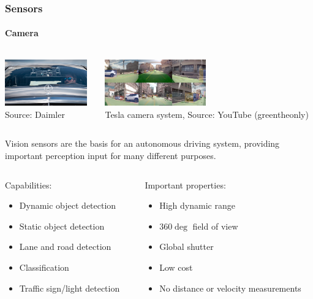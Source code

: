 \begin{frame}
\frametitle{Sensors}
\framesubtitle{Camera}
\begin{columns}[T]
    \begin{column}{.5\textwidth}
        \centering
        \includegraphics[height=2.0cm]{images/daimler_cameras.jpg}\\
        \tiny{Source: Daimler\footnotemark[1]}
    \end{column}
    \begin{column}{.5\textwidth}
        \centering
        \href{https://www.youtube.com/watch?v=rACZACXgreQ}{
        \includegraphics[height=2.0cm]{images/tesla_autopilot_cameras.jpg}}\\
        \tiny{Tesla camera system, Source: YouTube (greentheonly)\footnotemark[2]}
    \end{column}
\end{columns}

\vspace{0.2cm}

\footnotesize
Vision sensors are the basis for an autonomous driving system, providing
important perception input for many different purposes.

\begin{columns}[T]
    \begin{column}{0.45\textwidth}
        \footnotesize
        Capabilities:
        \begin{itemize}
            \item Dynamic object detection
            \item Static object detection
            \item Lane and road detection
            \item Classification
            \item Traffic sign/light detection
        \end{itemize}
    \end{column}
    \begin{column}{0.55\textwidth}
        \footnotesize
        Important properties:
        \begin{itemize}
            \item High dynamic range
            \item $360\deg$ field of view
            \item Global shutter
            \item Low cost
            \item No distance or velocity measurements
        \end{itemize}
    \end{column}
\end{columns}


\end{frame}
